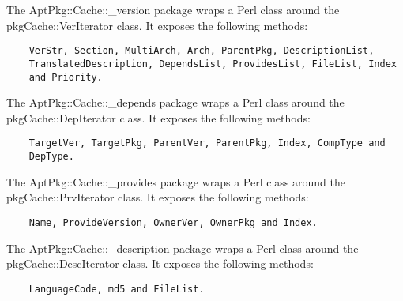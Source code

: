 \documentclass[]{article}
\begin{document}
The AptPkg::Cache::\_version package wraps a Perl class around the
pkgCache::VerIterator class. It exposes the following methods:

\begin{verbatim}
    VerStr, Section, MultiArch, Arch, ParentPkg, DescriptionList,
    TranslatedDescription, DependsList, ProvidesList, FileList, Index
    and Priority.
\end{verbatim}


The AptPkg::Cache::\_depends package wraps a Perl class around the
pkgCache::DepIterator class. It exposes the following methods:

\begin{verbatim}
    TargetVer, TargetPkg, ParentVer, ParentPkg, Index, CompType and
    DepType.
\end{verbatim}


The AptPkg::Cache::\_provides package wraps a Perl class around the
pkgCache::PrvIterator class. It exposes the following methods:

\begin{verbatim}
    Name, ProvideVersion, OwnerVer, OwnerPkg and Index.
\end{verbatim}


The AptPkg::Cache::\_description package wraps a Perl class around the
pkgCache::DescIterator class. It exposes the following methods:

\begin{verbatim}
    LanguageCode, md5 and FileList.
\end{verbatim}
\end{document}
